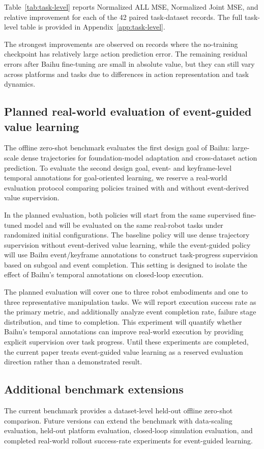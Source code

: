 Table~\ref{tab:task-level} reports Normalized ALL MSE, Normalized Joint MSE, and relative improvement for each of the 42 paired task-dataset records. The full task-level table is provided in Appendix~\ref{app:task-level}.

The strongest improvements are observed on records where the no-training checkpoint has relatively large action prediction error. The remaining residual errors after Baihu fine-tuning are small in absolute value, but they can still vary across platforms and tasks due to differences in action representation and task dynamics.

\subsection{Planned real-world evaluation of event-guided value learning}

The offline zero-shot benchmark evaluates the first design goal of Baihu: large-scale dense trajectories for foundation-model adaptation and cross-dataset action prediction. To evaluate the second design goal, event- and keyframe-level temporal annotations for goal-oriented learning, we reserve a real-world evaluation protocol comparing policies trained with and without event-derived value supervision.

In the planned evaluation, both policies will start from the same supervised fine-tuned model and will be evaluated on the same real-robot tasks under randomized initial configurations. The baseline policy will use dense trajectory supervision without event-derived value learning, while the event-guided policy will use Baihu event/keyframe annotations to construct task-progress supervision based on subgoal and event completion. This setting is designed to isolate the effect of Baihu's temporal annotations on closed-loop execution.

The planned evaluation will cover one to three robot embodiments and one to three representative manipulation tasks. We will report execution success rate as the primary metric, and additionally analyze event completion rate, failure stage distribution, and time to completion. This experiment will quantify whether Baihu's temporal annotations can improve real-world execution by providing explicit supervision over task progress. Until these experiments are completed, the current paper treats event-guided value learning as a reserved evaluation direction rather than a demonstrated result.

\subsection{Additional benchmark extensions}

The current benchmark provides a dataset-level held-out offline zero-shot comparison. Future versions can extend the benchmark with data-scaling evaluation, held-out platform evaluation, closed-loop simulation evaluation, and completed real-world rollout success-rate experiments for event-guided learning.
